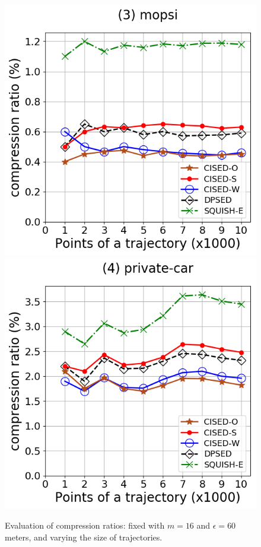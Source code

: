 \begin{figure}[tb!]
\includegraphics[scale = 0.30]{Figures/Exp-CR-size-mopsi.png}
\includegraphics[scale = 0.30]{Figures/Exp-CR-size-private.png}
\caption{\small Evaluation of compression ratios: fixed with $m=16$ and $\epsilon=60$ meters, and varying the size of trajectories.}
\label{fig:cr-size}
\end{figure}

